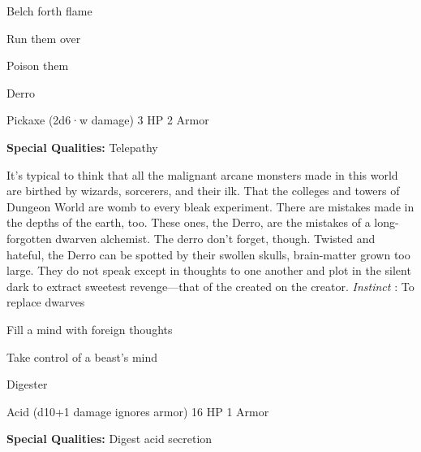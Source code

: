 \startitemize[1,packed]
         
\item Belch forth flame

         
\item Run them over

         
\item Poison them

       
\stopitemize
       
\startMonsterName
Derro	 
\stopMonsterName
       

Pickaxe (2d6·w damage)	3 HP	2 Armor

       


       
\startMonsterQualities
         {\bf Special Qualities:}  Telepathy
\stopMonsterQualities
       
\startMonsterDescription
It’s typical to think that all the malignant arcane monsters made in this world are birthed by wizards, sorcerers, and their ilk. That the colleges and towers of Dungeon World are womb to every bleak experiment. There are mistakes made in the depths of the earth, too. These ones, the Derro, are the mistakes of a long-forgotten dwarven alchemist. The derro don’t forget, though. Twisted and hateful, the Derro can be spotted by their swollen skulls, brain-matter grown too large. They do not speak except in thoughts to one another and plot in the silent dark to extract sweetest revenge—that of the created on the creator. {\em Instinct} : To replace dwarves
\stopMonsterDescription
       
\startitemize[1,packed]
         
\item Fill a mind with foreign thoughts

         
\item Take control of a beast's mind

       
\stopitemize
       
\startMonsterName
Digester	 
\stopMonsterName
       

Acid (d10+1 damage ignores armor)	16 HP	1 Armor

       


       
\startMonsterQualities
         {\bf Special Qualities:}  Digest acid secretion
\stopMonsterQualities
       
